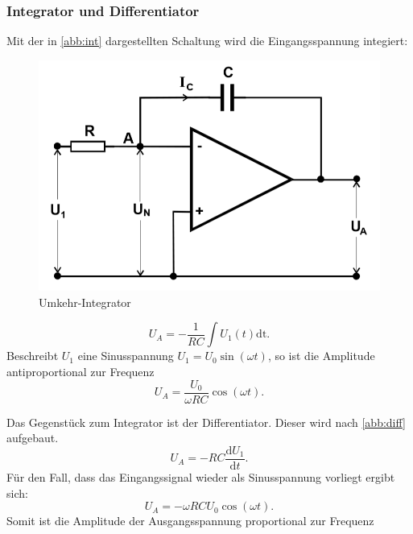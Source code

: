 \subsubsection{Integrator und Differentiator}
Mit der in \autoref{abb:int} dargestellten Schaltung wird die Eingangsspannung integiert:
\begin{figure}[h!]
 	\centering
 	\includegraphics[width=\textwidth]{img/int.png}
 	\caption{Umkehr-Integrator \cite{FP}}
 	\label{abb:int}
\end{figure}
\begin{equation}
U_A = - \frac{1}{RC} \int U_1(t) \text{dt} .
\end{equation}
Beschreibt $U_1$ eine Sinusspannung $U_1 = U_0 \sin(\omega t)$, so ist die Amplitude antiproportional zur Frequenz
\begin{equation}
U_A = \frac{U_0}{\omega RC} \cos(\omega t) .
\end{equation}

\noindent Das Gegenstück zum Integrator ist der Differentiator. Dieser wird nach \autoref{abb:diff} aufgebaut.
\begin{equation}
U_A = -RC \frac{\text{d} U_1}{\text{d} t} .
\end{equation}
Für den Fall, dass das Eingangssignal wieder als Sinusspannung vorliegt ergibt sich:
\begin{equation}
U_A = -\omega RCU_0 \cos(\omega t) .
\end{equation}
Somit ist die Amplitude der Ausgangsspannung proportional zur Frequenz

